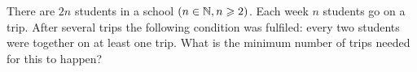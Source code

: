 There are $\displaystyle{2n}$ students in a school $\displaystyle{\left( {n \in {\Bbb N},n \geqslant 2} \right)}$. Each week $\displaystyle{n}$ students go on a trip. After several trips the following condition was fulfiled: every two students were together on at least one trip. What is the minimum number of trips needed for this to happen?

